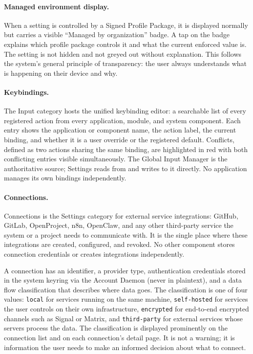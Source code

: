 \paragraph{Managed environment display.}
When a setting is controlled by a Signed Profile Package, it is displayed
normally but carries a visible ``Managed by organization'' badge. A tap on the
badge explains which profile package controls it and what the current enforced
value is. The setting is not hidden and not greyed out without explanation.
This follows the system's general principle of transparency: the user always
understands what is happening on their device and why.

\paragraph{Keybindings.}
The Input category hosts the unified keybinding editor: a searchable list of
every registered action from every application, module, and system component.
Each entry shows the application or component name, the action label, the
current binding, and whether it is a user override or the registered default.
Conflicts, defined as two actions sharing the same binding, are highlighted in red
with both conflicting entries visible simultaneously. The Global Input Manager
is the authoritative source; Settings reads from and writes to it directly.
No application manages its own bindings independently.

\paragraph{Connections.}
\label{sec:connections}
Connections is the Settings category for external service integrations: GitHub,
GitLab, OpenProject, n8n, OpenClaw, and any other third-party service the
system or a project needs to communicate with. It is the single place where
these integrations are created, configured, and revoked. No other component
stores connection credentials or creates integrations independently.

A connection has an identifier, a provider type, authentication credentials
stored in the system keyring via the Account Daemon (never in plaintext), and
a data flow classification that describes where data goes. The classification
is one of four values: \texttt{local} for services running on the same machine,
\texttt{self-hosted} for services the user controls on their own
infrastructure, \texttt{encrypted} for end-to-end encrypted channels such as
Signal or Matrix, and \texttt{third-party} for external services whose servers
process the data. The classification is displayed prominently on the connection
list and on each connection's detail page. It is not a warning; it is
information the user needs to make an informed decision about what to connect.

